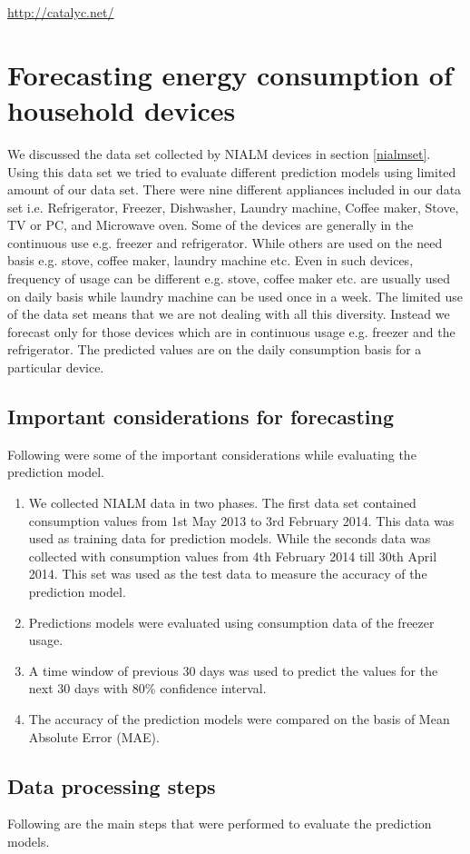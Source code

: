 \url{http://catalyc.net/}

\section{Forecasting energy consumption of household devices}
We discussed the data set collected by NIALM devices in section \ref{nialmset}. Using this data set we tried to evaluate different prediction models using limited amount of our data set. There were nine different appliances included in our data set i.e. Refrigerator, Freezer, Dishwasher, Laundry machine, Coffee maker, Stove, TV or PC, and Microwave oven. Some of the devices are generally in the continuous use e.g. freezer and refrigerator. While others are used on the need basis e.g. stove, coffee maker, laundry machine etc. Even in such devices, frequency of usage can be different e.g. stove, coffee maker etc. are usually used on daily basis while laundry machine can be used once in a week. The limited use of the data set means that we are not dealing with all this diversity. Instead we forecast only for those devices which are in continuous usage e.g. freezer and the refrigerator. The predicted values are on the daily consumption basis for a particular device.  
\subsection{Important considerations for forecasting}
Following were some of the important considerations while evaluating the prediction model.
\begin{enumerate}
\item We collected NIALM data in two phases. The first data set contained consumption values from 1st May 2013 to 3rd February 2014. This data was used as training data for prediction models. While the seconds data was collected with consumption values from 4th February 2014 till 30th April 2014. This set was used as the test data to measure the accuracy of the prediction model.
\item Predictions models were evaluated using consumption data of the freezer usage.
\item A time window of previous 30 days was used to predict the values for the next 30 days with 80\% confidence interval.
\item  The accuracy of the prediction models were compared on the basis of Mean Absolute Error (MAE).
\end{enumerate}     

\subsection{Data processing steps}
Following are the main steps that were performed to evaluate the prediction models.

